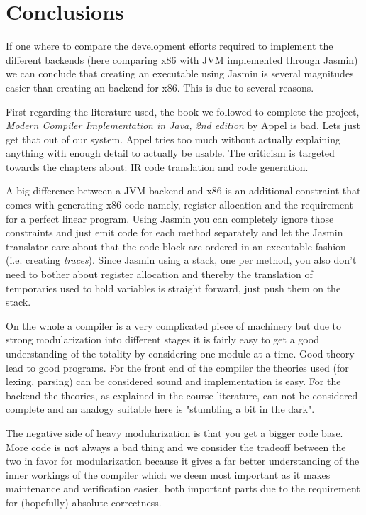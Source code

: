 \documentclass[11pt]{amsart}
\begin{document}
\section{Conclusions}
If one where to compare the development efforts required to implement the different backends (here comparing x86 with JVM implemented through Jasmin) we can conclude that creating an executable using Jasmin is several magnitudes easier than creating an backend for x86. This is due to several reasons.

First regarding the literature used, the book we followed to complete the project, \textit{Modern Compiler Implementation in Java, 2nd edition} by Appel\cite{appel} is bad. Lets just get that out of our system. Appel tries too much without actually explaining anything with enough detail to actually be usable. The criticism is targeted towards the chapters about: IR code translation and code generation.

A big difference between a JVM backend and x86 is an additional constraint that comes with generating x86 code namely, register allocation and the requirement for a perfect linear program. Using Jasmin you can completely ignore those constraints and just emit code for each method separately and let the Jasmin translator care about that the code block are ordered in an executable fashion (i.e. creating \textit{traces}). Since Jasmin using a stack, one per method, you also don't need to bother about register allocation and thereby the translation of temporaries used to hold variables is straight forward, just push them on the stack.

On the whole a compiler is a very complicated piece of machinery but due to strong modularization into different stages it is fairly easy to get a good understanding of the totality by considering one module at a time. Good theory lead to good programs. For the front end of the compiler the theories used (for lexing, parsing) can be considered sound and implementation is easy. For the backend the theories, as explained in the course literature, can not be considered complete and an analogy suitable here is "stumbling a bit in the dark".

The negative side of heavy modularization is that you get a bigger code base. More code is not always a bad thing and we consider the tradeoff between the two in favor for modularization because it gives a far better understanding of the inner workings of the compiler which we deem most important as it makes maintenance and verification easier, both important parts due to the requirement for (hopefully) absolute correctness.
\end{document}
